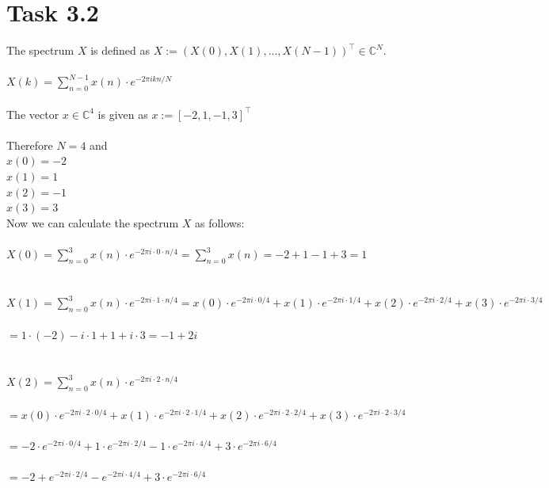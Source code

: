 \documentclass[12pt]{article}
\begin{document}
\section*{Task 3.2}
The spectrum $X$ is defined as $X:=(X(0),X(1),...,X(N-1))^\top \in \mathbb{C}^{N}$.\\\\
$X(k) = \sum_{n=0}^{N-1} x(n) \cdot e^{-2\pi ikn/N}$\\\\
The vector $x \in \mathbb{C}^{4}$ is given as $x:=[-2,1,-1,3]^\top$\\\\
Therefore $N=4$ and\\
$x(0)=-2$\\
$x(1)=1$\\
$x(2)=-1$\\
$x(3)=3$\\
Now we can calculate the spectrum $X$ as follows:\\\\
$X(0) = \sum_{n=0}^{3} x(n) \cdot e^{-2\pi i \cdot 0 \cdot n/4} = \sum_{n=0}^{3} x(n) = -2+1-1+3 = 1$\\\\\\
$X(1) = \sum_{n=0}^{3} x(n) \cdot e^{-2\pi i \cdot 1 \cdot n/4} = x(0) \cdot e^{-2\pi i \cdot 0/4} + x(1) \cdot e^{-2\pi i \cdot 1/4} + x(2) \cdot e^{-2\pi i \cdot 2/4} + x(3) \cdot e^{-2\pi i \cdot 3/4}$\\\\
$ = 1 \cdot (-2) - i \cdot 1 + 1 + i \cdot 3 = -1 + 2i$\\\\\\
$X(2) = \sum_{n=0}^{3} x(n) \cdot e^{-2\pi i \cdot 2 \cdot n/4}$\\\\
$= x(0) \cdot e^{-2\pi i \cdot 2 \cdot 0/4} + x(1) \cdot e^{-2\pi i \cdot 2 \cdot 1/4} + x(2) \cdot e^{-2\pi i \cdot 2 \cdot 2/4} + x(3) \cdot e^{-2\pi i \cdot 2 \cdot 3/4}$\\\\
$= -2 \cdot e^{-2\pi i \cdot 0/4} + 1 \cdot e^{-2\pi i \cdot 2/4} -1 \cdot e^{-2\pi i \cdot 4/4} + 3 \cdot e^{-2\pi i \cdot 6/4}$\\\\
$= -2 + e^{-2\pi i \cdot 2/4} - e^{-2\pi i \cdot 4/4} + 3 \cdot e^{-2\pi i \cdot 6/4}$\\\\
\end{document}
